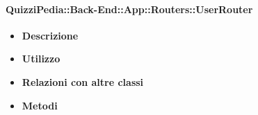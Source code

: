 \paragraph{QuizziPedia::Back-End::App::Routers::UserRouter}
	\begin{itemize}
		\item \textbf{Descrizione} \\
		\item \textbf{Utilizzo} \\
		\item \textbf{Relazioni con altre classi} \\
		\item \textbf{Metodi} \\
	\end{itemize}